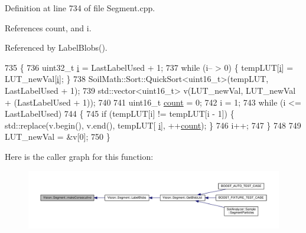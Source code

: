 Definition at line 734 of file Segment.\+cpp.



References count, and i.



Referenced by Label\+Blobs().


\begin{DoxyCode}
735     \{
736         uint32\_t \hyperlink{_comparision_pictures_2_createtest_image_8m_a6f6ccfcf58b31cb6412107d9d5281426}{i} = LastLabelUsed + 1;
737         \textcolor{keywordflow}{while} (i-- > 0) \{ tempLUT[\hyperlink{_comparision_pictures_2_createtest_image_8m_a6f6ccfcf58b31cb6412107d9d5281426}{i}] = LUT\_newVal[\hyperlink{_comparision_pictures_2_createtest_image_8m_a6f6ccfcf58b31cb6412107d9d5281426}{i}]; \}
738         SoilMath::Sort::QuickSort<uint16\_t>(tempLUT, LastLabelUsed + 1);
739         std::vector<uint16\_t> v(LUT\_newVal, LUT\_newVal + (LastLabelUsed + 1));
740 
741         uint16\_t \hyperlink{_comparision_pictures_2_createtest_image_8m_ae11b3deb3de3df7dc48e439074023e35}{count} = 0;
742         i = 1;
743         \textcolor{keywordflow}{while} (i <= LastLabelUsed)
744         \{
745             \textcolor{keywordflow}{if} (tempLUT[i] != tempLUT[i - 1]) \{ std::replace(v.begin(), v.end(), tempLUT[
      \hyperlink{_comparision_pictures_2_createtest_image_8m_a6f6ccfcf58b31cb6412107d9d5281426}{i}], ++\hyperlink{_comparision_pictures_2_createtest_image_8m_ae11b3deb3de3df7dc48e439074023e35}{count}); \}
746             i++;
747         \}
748 
749         LUT\_newVal = &v[0];
750     \}
\end{DoxyCode}


Here is the caller graph for this function\+:\nopagebreak
\begin{figure}[H]
\begin{center}
\leavevmode
\includegraphics[width=350pt]{class_vision_1_1_segment_a3543a9696469dc07718c8227eaeaf9c0_icgraph}
\end{center}
\end{figure}


\hypertarget{class_vision_1_1_segment_a1bfc12c503f6e07cca595ec884273e13}{}
